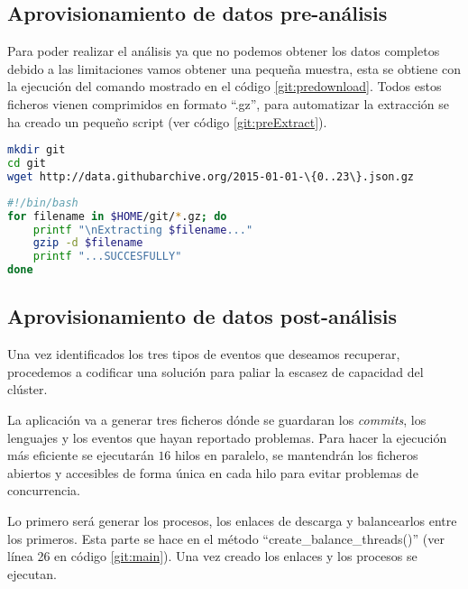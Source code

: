\subsection{Aprovisionamiento de datos pre-análisis}
Para poder realizar el análisis ya que no podemos obtener los datos completos debido a las limitaciones vamos obtener una pequeña muestra, esta se obtiene con la ejecución del comando mostrado en el código \ref{git:predownload}. Todos estos ficheros vienen comprimidos en formato ``.gz'', para automatizar la extracción se ha creado un pequeño script (ver código \ref{git:preExtract}).

\begin{lstlisting}[label=git:predownload,language=sh,frame=single,caption=Comando para el preaprovisionamiento de datos de GitHub.]
mkdir git
cd git
wget http://data.githubarchive.org/2015-01-01-\{0..23\}.json.gz
\end{lstlisting}

\begin{lstlisting}[label=git:preExtract,language=sh,frame=single,caption=Script para la extracción automática de los ficheros de GitHub.]
#!/bin/bash
for filename in $HOME/git/*.gz; do
	printf "\nExtracting $filename..."
	gzip -d $filename
	printf "...SUCCESFULLY"
done
\end{lstlisting}

\subsection{Aprovisionamiento de datos post-análisis}
Una vez identificados los tres tipos de eventos que deseamos recuperar, procedemos a codificar una solución para paliar la escasez de capacidad del clúster.

La aplicación va a generar tres ficheros dónde se guardaran los \textit{commits}, los lenguajes y los eventos que hayan reportado problemas. Para hacer la ejecución más eficiente se ejecutarán $16$ hilos en paralelo, se mantendrán los ficheros abiertos y accesibles de forma única en cada hilo para evitar problemas de concurrencia.

Lo primero será generar los procesos, los enlaces de descarga y balancearlos entre los primeros. Esta parte se hace en el método ``create\_balance\_threads()'' (ver línea 26 en código \ref{git:main}). Una vez creado los enlaces y los procesos se ejecutan.

